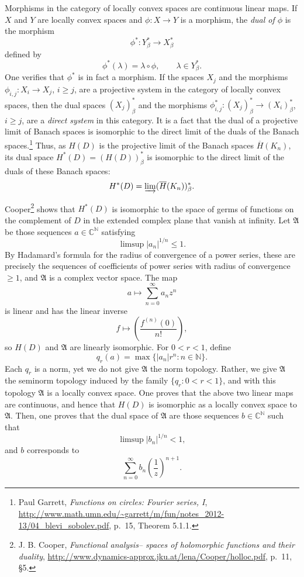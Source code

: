 \documentclass{article}
\begin{document}
Morphisms in the category of locally convex spaces are continuous linear maps. If $X$ and $Y$ are locally convex spaces and 
$\phi:X \to Y$ is a morphism, the {\em dual of $\phi$} is the morphism
\[
\phi^*:Y_\beta^* \to X_\beta^*
\]
defined by
\[
\phi^*(\lambda)=\lambda \circ \phi, \qquad \lambda \in Y_\beta^*.
\]
One verifies that $\phi^*$ is in fact a morphism.
If the spaces $X_j$ and the morphisms $\phi_{i,j}:X_i \to X_j$, $i \geq j$, are a projective system
in the category of locally convex spaces, then the dual spaces $(X_j)_\beta^*$ and the morphisms $\phi_{i,j}^*:(X_j)_\beta^* 
\to (X_i)^*_\beta$, $i \geq j$, are a {\em direct system} in this category.
It is a fact that the dual of a projective limit of Banach spaces is isomorphic  to the direct limit
of the duals of the Banach spaces.\footnote{Paul Garrett, {\em Functions on circles: Fourier series, I},  \url{http://www.math.umn.edu/~garrett/m/fun/notes_2012-13/04_blevi_sobolev.pdf}, p.~15, Theorem 5.1.1.}
Thus, as $H(D)$ is the projective limit of the Banach spaces $\overline{H}(K_n)$, its dual space $H^*(D)=(H(D))_\beta^*$ is isomorphic to the direct limit of the duals 
of these Banach spaces:
\[
H^*(D)=\varinjlim (\overline{H}(K_n))_\beta^*.
\]

Cooper\footnote{J. B. Cooper, {\em Functional analysis-- spaces of holomorphic functions and their duality}, \url{http://www.dynamics-approx.jku.at/lena/Cooper/holloc.pdf}, p.~11, \S 5.}
shows that $H^*(D)$ is isomorphic to the space of germs of functions on the complement of $D$ in the extended complex plane that vanish at infinity. 
Let $\mathfrak{A}$ be those sequences $a \in \mathbb{C}^\mathbb{N}$ satisfying
\[
\limsup |a_n|^{1/n} \leq 1.
\]
By Hadamard's formula for the radius of convergence of a power series, these are precisely the sequences of coefficients of power series with
radius of convergence $\geq 1$, and $\mathfrak{A}$ is a complex vector space. The map
\[
a \mapsto \sum_{n=0}^\infty a_n z^n
\]
is linear and has the linear inverse
\[
f \mapsto \left( \frac{f^{(n)}(0)}{n!} \right),
\]
so $H(D)$ and $\mathfrak{A}$ are linearly isomorphic. 
For $0<r<1$, define 
\[
q_r(a) = \max \{|a_n| r^n : n \in \mathbb{N}\}.
\]
Each $q_r$ is a norm, yet we do not give $\mathfrak{A}$ the norm topology. Rather, we give $\mathfrak{A}$ the seminorm topology induced by 
the family $\{ q_r : 0<r<1 \}$, and with this topology $\mathfrak{A}$ is a  locally convex space. 
One proves that the above two linear maps are continuous, and hence that $H(D)$ is isomorphic as a locally
convex space to $\mathfrak{A}$. Then, one proves that the dual space of $\mathfrak{A}$ are those
sequences $b \in \mathbb{C}^\mathbb{N}$ such that
\[
\limsup |b_n|^{1/n}<1,
\]
and $b$ corresponds to
\[
\sum_{n=0}^\infty b_n \left( \frac{1}{z} \right)^{n+1}.
\]
\end{document}
